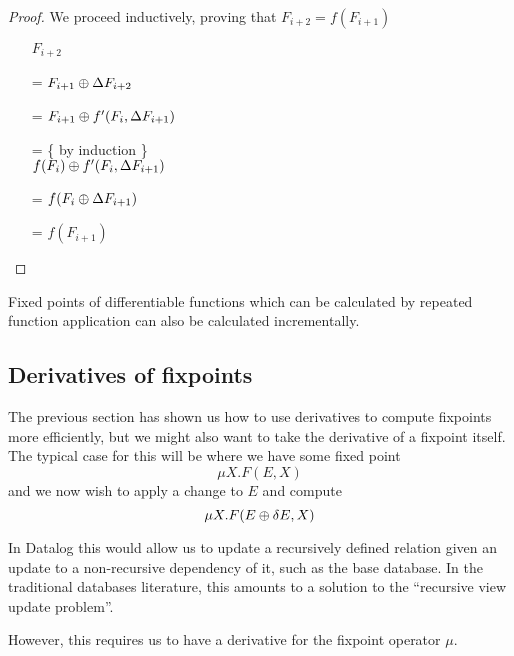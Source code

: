 
\begin{proof}
We proceed inductively, proving that $F_{i+2} = f(F_{i+1})$

\begin{itemize}
\item[ ]$F_{i+2}$
\item[=]
$
F_{i+1} \oplus \Delta F_{i+2}
$
\item[=]
$
F_{i+1} \oplus f'( F_i, \Delta F_{i+1})
$
\item[=] \{ by induction \}\\
$
f(F_i) \oplus f'(F_i, \Delta F_{i+1})
$
\item[=]
$
f(F_i \oplus \Delta F_{i+1})
$ 
\item[=]
$f(F_{i+1})$
\end{itemize}
\end{proof}

\begin{corollary}
\label{corollary:diffFP}
  Fixed points of differentiable functions which can be calculated by repeated
  function application can also be calculated incrementally.
\end{corollary}

\subsection{Derivatives of fixpoints}

The previous section has shown us how to use derivatives to compute fixpoints
more efficiently, but we might also want to take the derivative of a fixpoint
itself. The typical case for this will be where we have some fixed point
$$\mu X. F(E, X)$$
and we now wish to apply a change to $E$ and compute
$$\mu X. F(E \oplus \delta E, X)$$

In Datalog this would allow us to update a recursively defined relation given an
update to a non-recursive dependency of it, such as the base database. In the
traditional databases literature, this amounts to a solution to the ``recursive
view update problem''.

However, this requires us to have a derivative for the fixpoint operator $\mu$.

